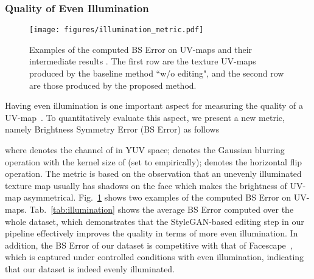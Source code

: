 \documentclass[10pt,twocolumn,letterpaper]{article}
\begin{document}
\vspace{-3mm}
\subsubsection{Quality of Even Illumination}
\vspace{-2mm}


\begin{figure}[!t]
  \centering
   \texttt{[image: figures/illumination\_metric.pdf]}
   \caption{Examples of the computed BS Error on UV-maps and their intermediate results . The first row are the texture UV-maps produced by the baseline method ``w/o editing", and the second row are those produced by the proposed method.}
   \label{fig:illumination-metric}
\end{figure}


\begin{table}[!t]
\caption{Quantitative evaluation on the illumination of the proposed UV-texture dataset in terms of BS Error, where  denotes the dataset which is captured under controlled conditions.}
\small
\centering
{}
\label{tab:illumination}
\end{table} 

Having even illumination is one important aspect for measuring the quality of a UV-map~\cite{luo2021normalized}.
To quantitatively evaluate this aspect, we present a new metric, namely Brightness Symmetry Error (BS Error) as follows

where  denotes the  channel of  in YUV space;  denotes the Gaussian blurring operation with the kernel size of  (set to  empirically);  denotes the horizontal flip operation.
The metric is based on the observation that an unevenly illuminated texture map usually has shadows on the face which makes the brightness of UV-map asymmetrical. 
Fig.~\ref{fig:illumination-metric} shows two examples of the computed BS Error on UV-maps.
Tab.~\ref{tab:illumination} shows the average BS Error computed over the whole dataset, which demonstrates that the StyleGAN-based editing step in our pipeline effectively improves the quality in terms of more even illumination.
In addition, the BS Error of our dataset is competitive with that of Facescape~\cite{yang2020facescape}, which is captured under controlled conditions with even illumination, indicating that our dataset is indeed evenly illuminated.
\end{document}
